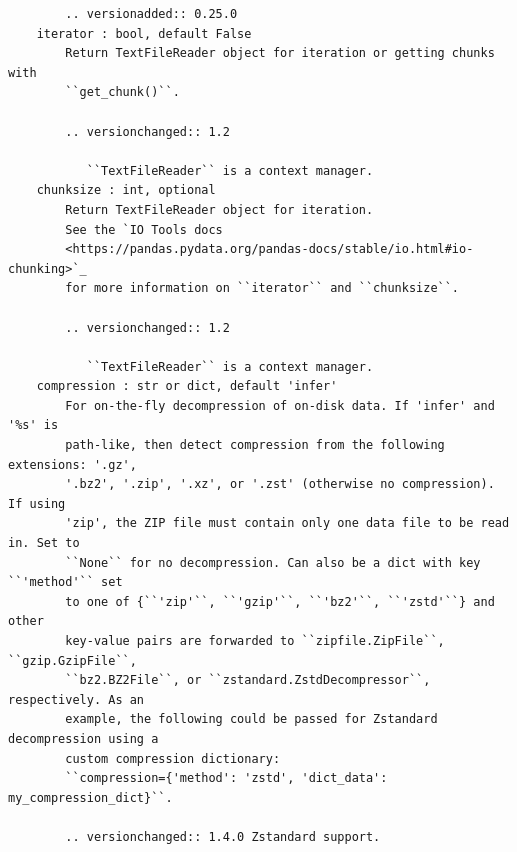 \documentclass[
  letterpaper,
]{book}
\begin{document}
\begin{verbatim}
        .. versionadded:: 0.25.0
    iterator : bool, default False
        Return TextFileReader object for iteration or getting chunks with
        ``get_chunk()``.

        .. versionchanged:: 1.2

           ``TextFileReader`` is a context manager.
    chunksize : int, optional
        Return TextFileReader object for iteration.
        See the `IO Tools docs
        <https://pandas.pydata.org/pandas-docs/stable/io.html#io-chunking>`_
        for more information on ``iterator`` and ``chunksize``.

        .. versionchanged:: 1.2

           ``TextFileReader`` is a context manager.
    compression : str or dict, default 'infer'
        For on-the-fly decompression of on-disk data. If 'infer' and '%s' is
        path-like, then detect compression from the following extensions: '.gz',
        '.bz2', '.zip', '.xz', or '.zst' (otherwise no compression). If using
        'zip', the ZIP file must contain only one data file to be read in. Set to
        ``None`` for no decompression. Can also be a dict with key ``'method'`` set
        to one of {``'zip'``, ``'gzip'``, ``'bz2'``, ``'zstd'``} and other
        key-value pairs are forwarded to ``zipfile.ZipFile``, ``gzip.GzipFile``,
        ``bz2.BZ2File``, or ``zstandard.ZstdDecompressor``, respectively. As an
        example, the following could be passed for Zstandard decompression using a
        custom compression dictionary:
        ``compression={'method': 'zstd', 'dict_data': my_compression_dict}``.

        .. versionchanged:: 1.4.0 Zstandard support.


\end{verbatim}
\end{document}
